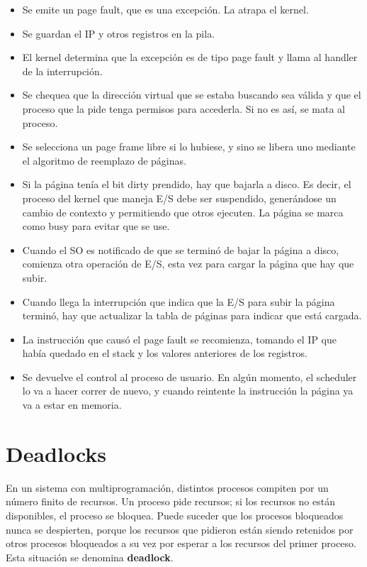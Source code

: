 \begin{itemize}
\item Se emite un page fault, que es una excepción. La atrapa el kernel.
\item Se guardan el IP y otros registros en la pila.
\item El kernel determina que la excepción es de tipo page fault y llama al handler de la interrupción.
\item Se chequea que la dirección virtual que se estaba buscando sea válida y que el proceso que la pide tenga permisos para accederla. Si no es así, se mata al proceso.
\item Se selecciona un page frame libre si lo hubiese, y sino se libera uno mediante el algoritmo de reemplazo de páginas.
\item Si la página tenía el bit dirty prendido, hay que bajarla a disco. Es decir, el proceso del kernel que maneja E/S debe ser suspendido, generándose un cambio de contexto y permitiendo que otros ejecuten. La página se marca como busy para evitar que se use.
\item Cuando el SO es notificado de que se terminó de bajar la página a disco, comienza otra operación de E/S, esta vez para cargar la página que hay que subir.
\item Cuando llega la interrupción que indica que la E/S para subir la página terminó, hay que actualizar la tabla de páginas para indicar que está cargada.
\item La instrucción que causó el page fault se recomienza, tomando el IP que había quedado en el stack y los valores anteriores de los registros.
\item Se devuelve el control al proceso de usuario. En algún momento, el scheduler lo va a hacer correr de nuevo, y cuando reintente la instrucción la página ya va a estar en memoria.
\end{itemize}

\newpage
\section{Deadlocks}

En un sistema con multiprogramación, distintos procesos compiten por un número finito de recursos. Un proceso pide recursos; si los recursos no están disponibles, el proceso se bloquea. Puede suceder que los procesos bloqueados nunca se despierten, porque los recursos que pidieron están siendo retenidos por otros procesos bloqueados a su vez por esperar a los recursos del primer proceso.  Esta situación se denomina \textbf{deadlock}.

